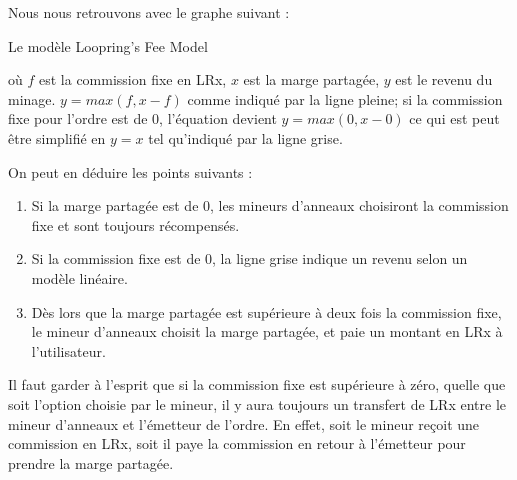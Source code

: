 \documentclass[UTF8,nofonts]{article}
\makeatletter
\newenvironment{figurehere}
 {\def\@captype{figure}}
 {}
\makeatother
\begin{document}
\begin{multicols}{2}
Nous nous retrouvons avec le graphe suivant :

\begin{center}
\begin{figurehere}
\centering
{}
\caption{Le modèle Loopring's Fee Model}
\label{fig:feemodel}
\end{figurehere}
\end{center}


où $f$ est la commission fixe en LRx, $x$ est la marge partagée, $y$ est le revenu du minage. $y=max(f, x-f)$ comme indiqué par la ligne pleine; si la commission fixe pour l'ordre est de $0$, l'équation devient $y=max(0, x - 0)$ ce qui est peut être simplifié en $y=x$ tel qu'indiqué par la ligne grise.


On peut en déduire les points suivants :
\begin{enumerate}
	\item Si la marge partagée est de 0, les mineurs d'anneaux choisiront la commission fixe et sont toujours récompensés.
	\item Si la commission fixe est de 0, la ligne grise indique un revenu selon un modèle linéaire.
	\item Dès lors que la marge partagée est supérieure à deux fois la commission fixe, le mineur d'anneaux choisit la marge partagée, et paie un montant en LRx à l'utilisateur.
\end{enumerate}

Il faut garder à l'esprit que si la commission fixe est supérieure à zéro, quelle que soit l'option choisie par le mineur, il y aura toujours un transfert de LRx entre le mineur d'anneaux et l'émetteur de l'ordre. En effet, soit le mineur reçoit une commission en LRx, soit il paye la commission en retour à l'émetteur pour prendre la marge partagée.


\end{multicols}
\end{document}
